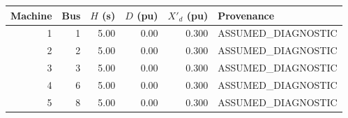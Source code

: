 \begin{tabular}{r r r r r l}\toprule
Machine & Bus & {$H$ (s)} & {$D$ (pu)} & {$X'_d$ (pu)} & Provenance \\ \midrule
1 & 1 & 5.00 & 0.00 & 0.300 & {ASSUMED\_DIAGNOSTIC} \\ 
2 & 2 & 5.00 & 0.00 & 0.300 & {ASSUMED\_DIAGNOSTIC} \\ 
3 & 3 & 5.00 & 0.00 & 0.300 & {ASSUMED\_DIAGNOSTIC} \\ 
4 & 6 & 5.00 & 0.00 & 0.300 & {ASSUMED\_DIAGNOSTIC} \\ 
5 & 8 & 5.00 & 0.00 & 0.300 & {ASSUMED\_DIAGNOSTIC} \\ 
\bottomrule\end{tabular}
